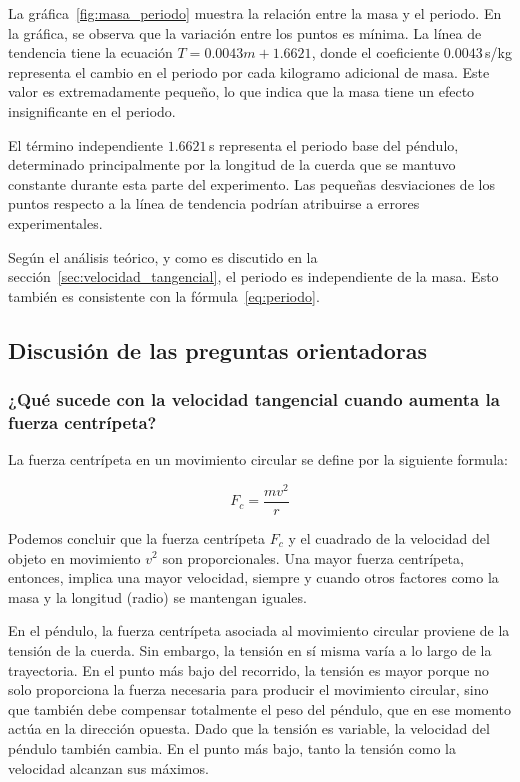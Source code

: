 \documentclass[twocolumn]{article}
\numberwithin{table}{section}
\begin{document}
La gráfica~\ref{fig:masa_periodo} muestra la relación entre la masa y
el periodo. En la gráfica, se observa que la variación entre los
puntos es mínima. La línea de tendencia tiene la ecuación $T =
0.0043m + 1.6621$,
donde el coeficiente $0.0043$\,s/kg representa el cambio en el periodo por cada
kilogramo adicional de masa. Este valor es extremadamente pequeño, lo que indica
que la masa tiene un efecto insignificante en el periodo.

El término independiente $1.6621$\,s representa el periodo base del péndulo,
determinado principalmente por la longitud de la cuerda que se mantuvo constante
durante esta parte del experimento. Las pequeñas desviaciones de los puntos
respecto a la línea de tendencia podrían atribuirse a errores experimentales.

Según el análisis teórico, y como es discutido en
la sección~\ref{sec:velocidad_tangencial}, el periodo es independiente de la
masa. Esto también es consistente con la fórmula~\eqref{eq:periodo}.

\subsection{Discusión de las preguntas orientadoras}

\subsubsection*{¿Qué sucede con la velocidad tangencial cuando
aumenta la fuerza centrípeta?}\label{sec:velocidad_tangencial}

La fuerza centrípeta en un movimiento circular se define por la
siguiente formula:

\begin{equation}
  F_{c} = \frac{mv^{2}}{r}
\end{equation}

Podemos concluir que la fuerza centrípeta $F_{c}$ y el cuadrado de la
velocidad del objeto en movimiento $v^{2}$ son proporcionales. Una
mayor fuerza centrípeta, entonces, implica una mayor velocidad,
siempre y cuando otros factores como la masa y la longitud (radio) se
mantengan iguales.

En el péndulo, la fuerza centrípeta asociada al movimiento circular
proviene de la tensión de la cuerda. Sin embargo, la tensión en sí
misma varía a lo largo de la trayectoria. En el punto más bajo del
recorrido, la tensión es mayor porque no solo proporciona la fuerza
necesaria para producir el movimiento circular, sino que también debe
compensar totalmente el peso del péndulo, que en ese momento actúa en
la dirección opuesta. Dado que la tensión es variable, la velocidad
del péndulo también cambia. En el punto más bajo, tanto la tensión
como la velocidad alcanzan sus máximos.
\end{document}
